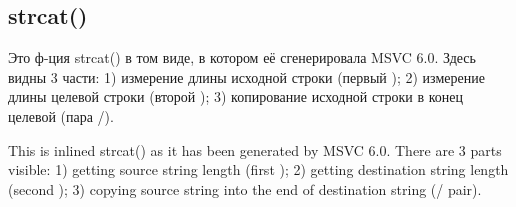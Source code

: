 \subsection{strcat()}

\ifdefined\RUSSIAN
Это ф-ция strcat() в том виде, в котором её сгенерировала MSVC 6.0.
Здесь видны 3 части:
1) измерение длины исходной строки (первый );
2) измерение длины целевой строки (второй );
3) копирование исходной строки в конец целевой (пара /).
\fi %

\ifdefined\ENGLISH
This is inlined strcat() as it has been generated by MSVC 6.0.
There are 3 parts visible:
1) getting source string length (first );
2) getting destination string length (second );
3) copying source string into the end of destination string (/ pair).
\fi %



